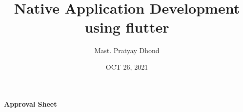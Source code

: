 \documentclass[11pt,a4paper,oneside,openright]{report}
\title{Native Application Development using flutter}
\author{Mast. Pratyay Dhond}
\date{OCT 26, 2021}
\begin{document}
\def\what{SYNOPSIS}
\def\title{Native Application Development using flutter}

\def\degree{{\bf \large Diploma in Engineering\\(Information Technology)}}
\def\first{\large  Mast. Pratyay Prasad Dhond }
\def\one{\Large 1907011}

\def\guide{\Large Dr. A R Mahajan}
\def\coguide{Prof.XYZ }

{} %

\vpcoetitlepage
\cleardoublepage
\thispagestyle{empty}
\thisfancypage{%
  \setlength{\fboxsep}{14pt}\shadowbox}{}
\begin{center} \label{chap:approval}
{\bf \huge {Approval Sheet}} \\

\vspace{0.8in}
\end{center}
\renewcommand{\baselinestretch}{1.5}
\end{document}
